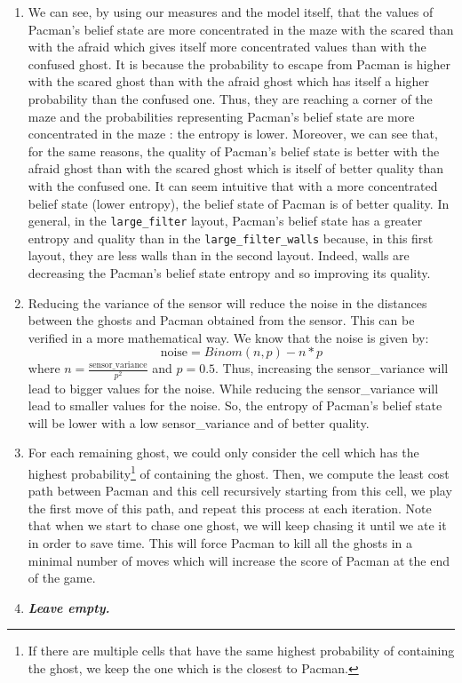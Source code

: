 \documentclass{article}
\begin{document}
\begin{enumerate}[label=\alph*.,leftmargin=*]
    \item We can see, by using our measures and the model itself, that the values of Pacman's belief state are more concentrated in the maze with the scared than with the afraid which gives itself more concentrated values than with the confused ghost. It is because the probability to escape from Pacman is higher with the scared ghost than with the afraid ghost which has itself a higher probability than the confused one. Thus, they are reaching a corner of the maze and the probabilities representing Pacman's belief state are more concentrated in the maze : the entropy is lower.
    Moreover, we can see that, for the same reasons, the quality of Pacman's belief state is better with the afraid ghost than with the scared ghost which is itself of better quality than with the confused one. It can seem intuitive that with a more concentrated belief state (lower entropy), the belief state of Pacman is of better quality. In general, in the \texttt{large\_filter} layout, Pacman's belief state has a greater entropy and quality than in the \texttt{large\_filter\_walls} because, in this first layout, they are less walls than in the second layout. Indeed, walls are decreasing the Pacman's belief state entropy and so improving its quality.
    \item Reducing the variance of the sensor will reduce the noise in the distances between the ghosts and Pacman obtained from the sensor. This can be verified in a more mathematical way. We know that the noise is given by: $$\text{noise} = Binom(n, p) - n * p$$
    where $n = \frac{\text{sensor\_variance}}{p^2}$ and $p = 0.5$. Thus, increasing the sensor\_variance will lead to bigger values for the noise. While reducing the sensor\_variance will lead to smaller values for the noise. So, the entropy of Pacman's belief state will be lower with a low sensor\_variance and of better quality.
    
    \item For each remaining ghost, we could only consider the cell which has the highest probability\footnote{If there are multiple cells that have the same highest probability of containing the ghost, we keep the one which is the closest to Pacman.} of containing the ghost. Then, we compute the least cost path between Pacman and this cell recursively starting from this cell, we play the first move of this path, and repeat this process at each iteration. Note that when we start to chase one ghost, we will keep chasing it until we ate it in order to save time. This will force Pacman to kill all the ghosts in a minimal number of moves which will increase the score of Pacman at the end of the game.
    \item \textbf{\textit{Leave empty.}}
\end{enumerate}

\end{document}
